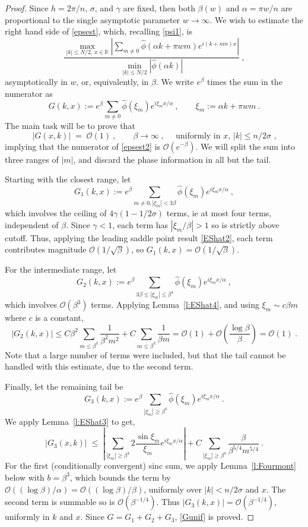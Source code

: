 \documentclass[10pt]{article}
\newcommand{\be}{\begin{equation}}
\newcommand{\ee}{\end{equation}}
\newcommand{\RR}{\mathbb{R}}
\newcommand{\bigO}{{\mathcal O}}
\newcommand{\freq}{\beta}          %
\newcommand{\rat}{\sigma}          %
\newcommand{\al}{\alpha}           %
\begin{document}
\begin{proof}
  Since $h=2\pi/n$, $\rat$, and $\gamma$ are fixed, then both $\freq(w)$
  and $\al=\pi w/n$ are proportional to the single asymptotic
  parameter $w \to\infty$.
  We wish to estimate the right hand side of
  \eqref{epsest}, which, recalling \eqref{psi1}, is
  \be
\frac{
  \max_{|k|\le N/2, \,x\in\RR} \left|
    \sum_{m\neq 0} \hat\phi(\al k+\pi w m) e^{i(k+mn)x}
  \right|
}{\min_{|k|\le N/2} |\hat\phi(\al k)|}
~,
\label{epsest2}
\ee
  asymptotically in $w$, or, equivalently, in $\freq$.
  We write $e^\freq$ times the sum in the numerator as
  \be
  G(k,x) := e^{\freq} \sum_{m\neq 0} \hat\phi(\xi_m) e^{i\xi_m x/\al}
  ~, \qquad \xi_m := \al k + \pi w m
  ~.
  \label{G}
  \ee
  The main task will be to prove that
  \be
  |G(x,k) | \; =\; \bigO(1)
  ~,\qquad \freq\to\infty~, \quad \mbox{ uniformly in $x$, $|k|\le n/2\rat$~,}
  \label{Gunif}
  \ee
  implying that the numerator of \eqref{epsest2} is $\bigO(e^{-\freq})$.
  We will split the sum into three ranges of $|m|$, and discard the
  phase information in all but the tail.

  Starting with the closest range, let
  $$
  G_1(k,x) :=  e^{\freq} \sum_{m\neq 0, |\xi_m|<3\freq} \hat\phi(\xi_m) e^{i\xi_m x/\al}~,
  $$
  which involves the ceiling of $4\gamma(1-1/2\rat)$ terms,
  ie at most four terms, independent of $\freq$.
  Since $\gamma<1$, each term has $|\xi_m/\beta|>1$ so is strictly
  above cutoff.
  Thus, applying the leading saddle point result \eqref{EShat2}, each term
  contributes magnitude $\bigO(1/\sqrt{\freq})$, so
  $G_1(k,x) = \bigO(1/\sqrt{\freq})$.

  For the intermediate range, let
  $$
  G_2(k,x)  :=  e^{\freq} \sum_{3\freq\le|\xi_m|\le\freq^4} \hat\phi(\xi_m) e^{i\xi_m x/\al}~,
  $$
  which involves $\bigO(\freq^3)$ terms.
  Applying Lemma~\ref{l:EShat4}, and using $\xi_m \sim c \freq m$
  where $c$ is a constant,
  $$
  |G_2(k,x)| \le C \freq^2 \sum_{m\le \freq^3} \frac{1}{\freq^2 m^2}
  + C \sum_{m\le \freq^3} \frac{1}{\freq m}
  = \bigO(1) + \bigO\left(\frac{\log \freq}{\freq}\right) = \bigO(1)~.
  $$
  Note that a large number of terms were included, but that the tail
  cannot be handled with this estimate, due to the second term.
  
  Finally, let the remaining tail be
  $$
  G_3(k,x)  :=  e^{\freq} \sum_{|\xi_m|\ge\freq^4} \hat\phi(\xi_m) e^{i\xi_m x/\al}~.
  $$
  We apply Lemma~\ref{l:EShat3} to get,
  $$
  |G_3(x,k)| \; \le \; \left|\sum_{|\xi_m|\ge\freq^4} 2\frac{\sin \xi_m}{\xi_m}
   e^{i\xi_m x/\al} \right|
   + C \sum_{|\xi_m|\ge\freq^4} \frac{\freq}{\freq^{5/4}m^{5/4}}
   ~.
   $$
   For the first (conditionally convergent) sinc sum, we apply
   Lemma~\ref{l:Fourmont} below with $b = \freq^3$,
   which bounds the term
   by $\bigO((\log \freq) / \al) = \bigO((\log \freq) / \freq)$,
   uniformly over $|k|<n/2\rat$ and $x$.
   The second term is summable so is $\bigO(\freq^{-1/4})$.
   Thus $|G_3(k,x)| = \bigO(\freq^{-1/4})$, uniformly in $k$ and $x$.
   Since $G = G_1 + G_2+G_3$, \eqref{Gunif} is proved.
   

\end{proof}
\end{document}
